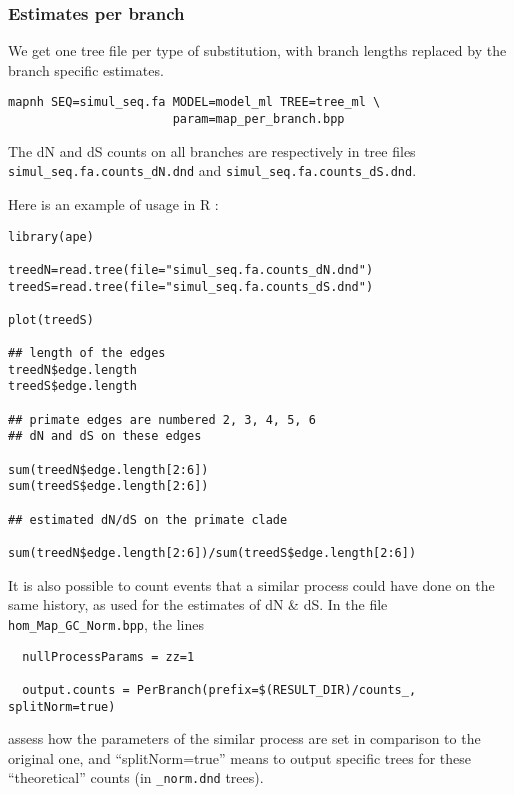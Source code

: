 \documentclass[11pt, a4paper]{article}
\begin{document}
\subsubsection*{Estimates per branch}

We get one tree file per type of substitution, with branch lengths
replaced by the branch specific estimates.

\begin{verbatim}
mapnh SEQ=simul_seq.fa MODEL=model_ml TREE=tree_ml \
                       param=map_per_branch.bpp
\end{verbatim}

The dN and dS counts on all branches are respectively in tree files
\\ 
\verb|simul_seq.fa.counts_dN.dnd| and
\verb|simul_seq.fa.counts_dS.dnd|.

\smallskip

Here is an example of usage in R :

\begin{verbatim}
library(ape)

treedN=read.tree(file="simul_seq.fa.counts_dN.dnd")  
treedS=read.tree(file="simul_seq.fa.counts_dS.dnd")  

plot(treedS)

## length of the edges 
treedN$edge.length
treedS$edge.length

## primate edges are numbered 2, 3, 4, 5, 6
## dN and dS on these edges

sum(treedN$edge.length[2:6])
sum(treedS$edge.length[2:6])

## estimated dN/dS on the primate clade

sum(treedN$edge.length[2:6])/sum(treedS$edge.length[2:6])

\end{verbatim}



It is also possible to count events that a similar process could have
done on the same history, as used for the estimates of dN \& dS. In the
file \texttt{hom\_Map\_GC\_Norm.bpp}, the lines


\begin{verbatim}
  nullProcessParams = zz=1

  output.counts = PerBranch(prefix=$(RESULT_DIR)/counts_, splitNorm=true)
\end{verbatim}

assess how the parameters of the similar process are set in comparison
to the original one, and ``splitNorm=true'' means to output specific
trees for these ``theoretical'' counts (in \texttt{\_norm.dnd} trees).
\end{document}
